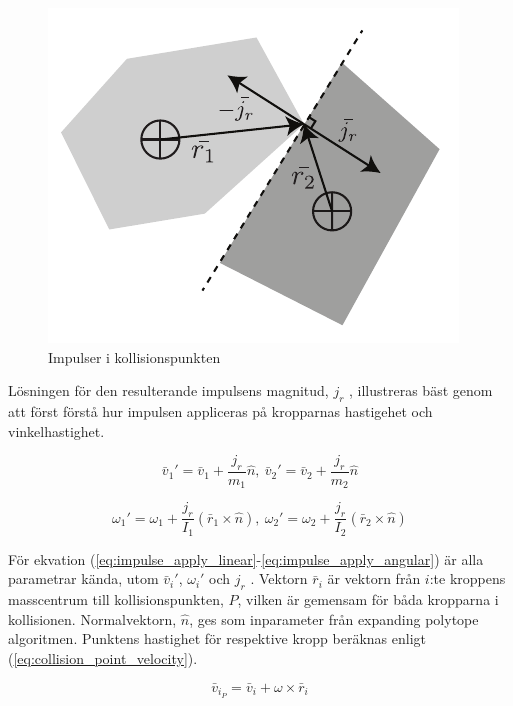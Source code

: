 \documentclass[a4paper,12pt,twopage,swedish]{article}
\begin{document}
\begin{figure}[h!]
	\centering
	\includegraphics{illustrations/impulse.pdf}
	\caption{Impulser i kollisionspunkten}
	\label{fig:impulse}
\end{figure}

Lösningen för den resulterande impulsens magnitud, $j_r$ , illustreras bäst genom att först förstå hur impulsen appliceras på kropparnas hastigehet och vinkelhastighet.

\begin{equation}\label{eq:impulse_apply_linear}
\bar{v}_1' = \bar{v}_1 + \frac{j_r}{m_1}\hat{n}, \ \bar{v}_2' = \bar{v}_2 + \frac{j_r}{m_2}\hat{n}
\end{equation}

\begin{equation}\label{eq:impulse_apply_angular}
\omega_1' = \omega_1 + \frac{j_r}{I_1}(\bar{r}_1 \times \hat{n}), \ \omega_2' = \omega_2 + \frac{j_r}{I_2}(\bar{r}_2 \times \hat{n})
\end{equation}

För ekvation (\ref{eq:impulse_apply_linear}-\ref{eq:impulse_apply_angular}) är alla parametrar kända, utom $\bar{v}_i'$, $\omega_i'$ och $j_r$ . Vektorn $\bar{r}_i$ är vektorn från $i$:te kroppens masscentrum till kollisionspunkten, $P$, vilken är gemensam för båda kropparna i kollisionen. Normalvektorn, $\hat{n}$, ges som inparameter från expanding polytope algoritmen. Punktens hastighet för respektive kropp beräknas enligt (\ref{eq:collision_point_velocity}).

\begin{equation}\label{eq:collision_point_velocity}
\bar{v}_{i_P} = \bar{v}_i + \omega \times \bar{r}_i
\end{equation}
\end{document}
